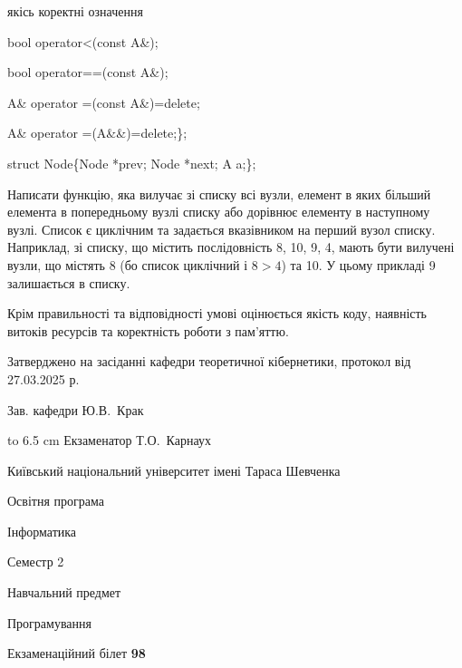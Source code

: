 \documentclass[12pt, ukrainian]{article}
\begin{document}
{\quad  якісь коректні означення 

\quad  bool operator<(const A\&); 

\quad  bool operator==(const A\&); 

\quad A\& operator =(const A\&)=delete; 

\quad  A\& operator =(A\&\&)=delete;\};

struct Node\{Node *prev; Node *next; A a;\};

Написати функцію, яка вилучає зі списку всі вузли, елемент в яких більший елемента в попередньому вузлі списку або дорівнює елементу в наступному вузлі. Список є циклічним та задається вказівником на перший вузол списку. Наприклад, зі списку, що містить послідовність 8, 10, 9, 4, мають бути вилучені вузли, що містять 8 (бо список циклічний і $8>4$) та 10. У цьому прикладі 9 залишається в списку.

Крім правильності та відповідності умові оцінюється якість коду, наявність витоків ресурсів та коректність роботи з пам'яттю. 

}
{\smallskip\smallskip \begin {scriptsize} Затверджено на засіданні кафедри теоретичної кібернетики, протокол   від   27.03.2025 р.\par\smallskip\smallskip\smallskip\smallskip
{\parbox {6.5 cm} {Зав. кафедри \dotfill Ю.В.~Крак}}\hspace {0.7cm} {\hbox to 6.5 cm { Екзаменатор \dotfill Т.О.~Карнаух}} \end{scriptsize}}
\newpage
{{\begin {scriptsize}\par
{ \center  Київський національний університет імені Тараса Шевченка \par}
{\parbox {5 cm}{Освітня програма \hfill}{\parbox {7 cm}{Інформатика\hfill}}\parbox {6 cm}{\hfill Семестр 2}}\par
{\parbox {5 cm} {Навчальний предмет \hfill}\parbox {7 cm}{Програмування \hfill}\parbox {6cm}{\hfill}\par}\vspace{-15pt} \end{scriptsize}}{\center Екзаменаційний білет \No \textbf { 98 }\par}}
\end{document}
